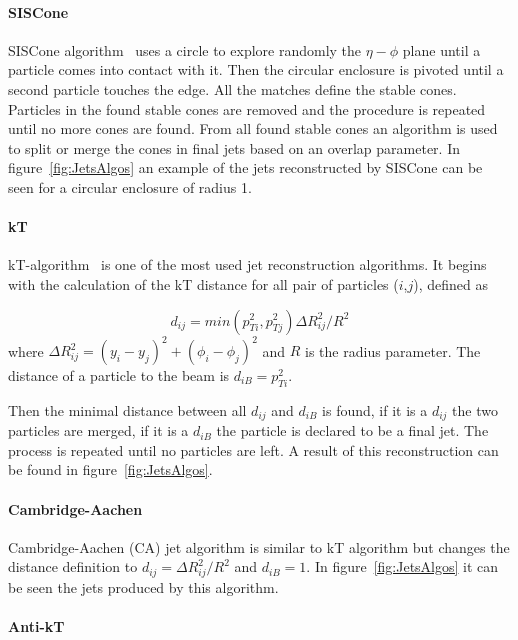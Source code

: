 \paragraph{SISCone}

SISCone algorithm~\cite{Salam:2007xv} uses a circle to explore randomly the $\eta-\phi$ plane until a particle comes into contact with it. Then the circular enclosure is pivoted until a second particle touches the edge. All the matches define the stable cones. Particles in the found stable cones are removed and the procedure is repeated until no more cones are found. From all found stable cones an algorithm is used to split or merge the cones in final jets based on an overlap parameter. In figure~\ref{fig:JetsAlgos} an example of the jets reconstructed by SISCone can be seen for a circular enclosure of radius 1. 

\paragraph{kT}

kT-algorithm~\cite{Ellis:1993tq} is one of the most used jet reconstruction algorithms. It begins with the calculation of the kT distance for all pair of particles ($i$,$j$), defined as

\begin{equation}
  \label{eq:kt}
  d_{ij}=min(p_{Ti}^{2},p_{Tj}^{2})\Delta R_{ij}^{2}/R^{2}
\end{equation} where $\Delta R_{ij}^{2}=(y_{i}-y_{j})^{2}+(\phi_{i}-\phi_{j})^{2}$ and $R$ is the radius parameter. The distance of a particle to the beam is $d_{iB}=p_{Ti}^{2}$. 

Then the minimal distance between all $d_{ij}$ and $d_{iB}$ is found, if it is a $d_{ij}$ the two particles are merged, if it is a $d_{iB}$ the particle is declared to be a final jet. The process is repeated until no particles are left. A result of this reconstruction can be found in figure~\ref{fig:JetsAlgos}. 

\paragraph{Cambridge-Aachen}

Cambridge-Aachen (CA) jet algorithm is similar to kT algorithm but changes the distance definition to $d_{ij}=\Delta R_{ij}^{2}/R^{2}$ and $d_{iB}=1$. In figure~\ref{fig:JetsAlgos} it can be seen the jets produced by this algorithm.

\paragraph{Anti-kT}

